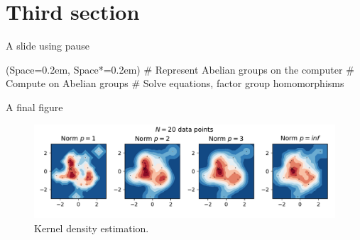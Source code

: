 \documentclass[12pt, aspectratio=149]{beamer}
\newcommand{\listSpace}{0.2em}
\theoremstyle{plain}
\begin{document}
\section{Third section}
\begin{frame}[fragile, t]{A slide using pause}
	\begin{easylist}[itemize]
		\ListProperties(Space=\listSpace, Space*=\listSpace)
		# Represent Abelian groups on the computer \pause
		# Compute on Abelian groups \pause
		# Solve equations, factor group homomorphisms 
	\end{easylist}
\end{frame}

\begin{frame}[fragile, t]{A final figure}
	\begin{figure}
		\centering
		\includegraphics[width=1\linewidth]{figs/kde_example}
		\caption{Kernel density estimation.}
		\label{fig:kde_example}
	\end{figure}
\end{frame}
\end{document}
